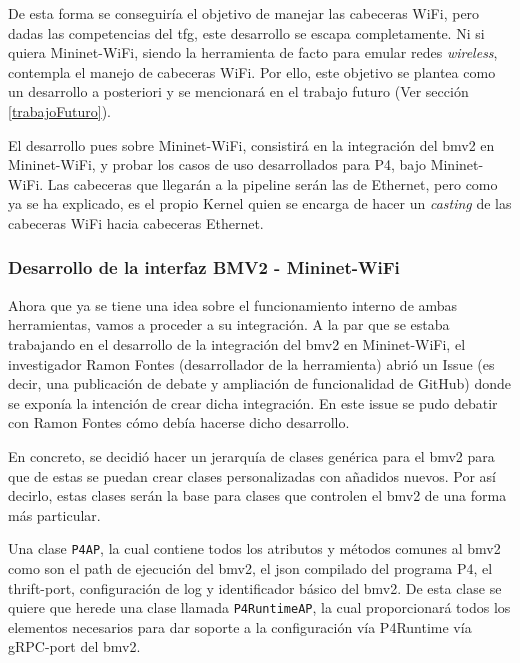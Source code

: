 De esta forma se conseguiría el objetivo de manejar las cabeceras WiFi, pero dadas las competencias del \gls{tfg}, este desarrollo se escapa completamente. Ni si quiera Mininet-WiFi, siendo la herramienta de facto para emular redes \textit{wireless}, contempla el manejo de cabeceras WiFi. Por ello, este objetivo se plantea como un desarrollo a posteriori y se mencionará en el trabajo futuro (Ver sección \ref{trabajoFuturo}). \\
\par
El desarrollo pues sobre Mininet-WiFi, consistirá en la integración del \gls{bmv2} en Mininet-WiFi, y probar los casos de uso desarrollados para P4, bajo Mininet-WiFi. Las cabeceras que llegarán a la pipeline serán las de Ethernet, pero como ya se ha explicado, es el propio Kernel quien se encarga de hacer un \textit{casting} de las cabeceras WiFi hacia cabeceras Ethernet.\\
\par

\subsubsection{Desarrollo de la interfaz BMV2 - Mininet-WiFi}

Ahora que ya se tiene una idea sobre el funcionamiento interno de ambas herramientas, vamos a proceder a su integración. A la par que se estaba trabajando en el desarrollo de la integración del \gls{bmv2} en Mininet-WiFi, el investigador Ramon Fontes (desarrollador de la herramienta) abrió un Issue (es decir, una publicación de debate y ampliación de funcionalidad de GitHub) donde se exponía la intención de crear dicha integración. En este issue se pudo debatir con Ramon Fontes cómo debía hacerse dicho desarrollo.\\
\par

En concreto, se decidió hacer un jerarquía de clases genérica para el \gls{bmv2} para que de estas se puedan crear clases personalizadas con añadidos nuevos. Por así decirlo, estas clases serán la base para clases que controlen el \gls{bmv2} de una forma más particular.\\
\par
Una clase \texttt{P4AP}, la cual contiene todos los atributos y métodos comunes al \gls{bmv2} como son el path de ejecución del \gls{bmv2}, el json compilado del programa P4, el thrift-port, configuración de log y identificador básico del \gls{bmv2}. De esta clase se quiere que herede una clase llamada \texttt{P4RuntimeAP}, la cual proporcionará todos los elementos necesarios para dar soporte a la configuración vía P4Runtime vía gRPC-port del \gls{bmv2}.\\
\par

